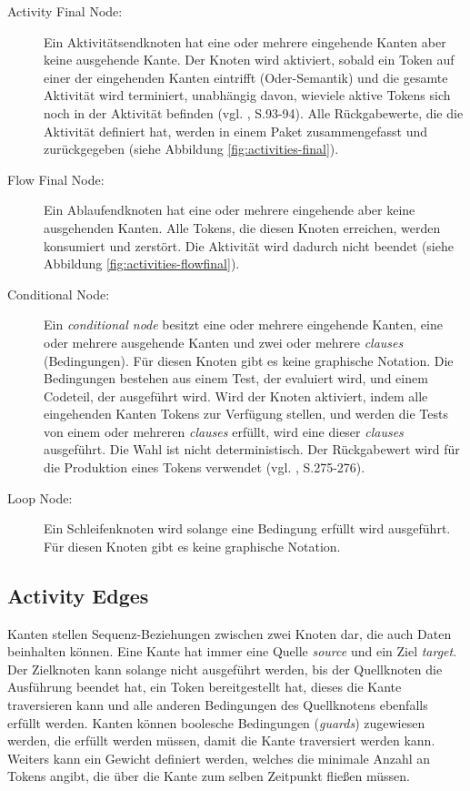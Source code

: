 \begin{description}
\item[Activity Final Node:] Ein Aktivitätsendknoten hat eine oder mehrere eingehende Kanten aber keine ausgehende Kante. Der Knoten wird aktiviert, sobald ein Token auf einer der eingehenden Kanten eintrifft (Oder-Semantik) und die gesamte Aktivität wird terminiert, unabhängig davon, wieviele aktive Tokens sich noch in der Aktivität befinden (vgl. \citep{WeilkiensOestereich2004}, S.93-94). Alle Rückgabewerte, die die Aktivität definiert hat, werden in einem Paket zusammengefasst und zurückgegeben (siehe Abbildung \ref{fig:activities-final}).

\item[Flow Final Node:] Ein Ablaufendknoten hat eine oder mehrere eingehende aber keine ausgehenden Kanten. Alle Tokens, die diesen Knoten erreichen, werden konsumiert und zerstört. Die Aktivität wird dadurch nicht beendet (siehe Abbildung \ref{fig:activities-flowfinal}).

\item[Conditional Node:] Ein \emph{conditional node} besitzt eine oder mehrere eingehende Kanten, eine oder mehrere ausgehende Kanten und zwei oder mehrere \emph{clauses} (Bedingungen). Für diesen Knoten gibt es keine graphische Notation. Die Bedingungen bestehen aus einem Test, der evaluiert wird, und einem Codeteil, der ausgeführt wird. Wird der Knoten aktiviert, indem alle eingehenden Kanten Tokens zur Verfügung stellen, und werden die Tests von einem oder mehreren \emph{clauses} erfüllt, wird eine dieser \emph{clauses} ausgeführt. Die Wahl ist nicht deterministisch. Der Rückgabewert wird für die Produktion eines Tokens verwendet (vgl. \citep{RumbaughJacobsonBooch2005}, S.275-276).

\item[Loop Node:] Ein Schleifenknoten wird solange eine Bedingung erfüllt wird ausgeführt. Für diesen Knoten gibt es keine graphische Notation.
\end{description}


\subsection{Activity Edges}
Kanten stellen Sequenz-Beziehungen zwischen zwei Knoten dar, die auch Daten beinhalten können. Eine Kante hat immer eine Quelle \emph{source} und ein Ziel \emph{target}. Der Zielknoten kann solange nicht ausgeführt werden, bis der Quellknoten die Ausführung beendet hat, ein Token bereitgestellt hat, dieses die Kante traversieren kann und alle anderen Bedingungen des Quellknotens ebenfalls erfüllt werden.
Kanten können boolesche Bedingungen (\emph{guards}) zugewiesen werden, die erfüllt werden müssen, damit die Kante traversiert werden kann. Weiters kann ein Gewicht definiert werden, welches die minimale Anzahl an Tokens angibt, die über die Kante zum selben Zeitpunkt fließen müssen.

